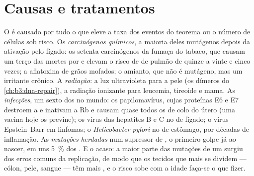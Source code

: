 \section{Causas e tratamentos}

\begin{proposition}[Causas]\label{prop:b3:cancer-biology:causes}
O  é causado por tudo o que eleve a taxa dos eventos do teorema
ou o número de células sob risco. Os \emph{carcinógenos químicos}, a
maioria deles mutágenos depois da ativação pelo fígado: os setenta
carcinógenos da fumaça do tabaco, que causam um terço das mortes por
 e elevam o risco de  de pulmão de quinze a vinte e cinco
vezes; a aflatoxina de grãos mofados; o amianto, que não é mutágeno,
mas um irritante crônico. A \emph{radiação}: a luz ultravioleta para a
pele (os dímeros do \cref{ch:b3:dna-repair}), a radiação ionizante para
leucemia, tireoide e mama. As \emph{infecções}, um sexto dos 
no mundo: os papilomavírus, cujas proteínas E6 e E7 destroem a  e
inativam a Rb e causam quase todos os  de colo do útero (uma
vacina hoje os previne); os vírus das hepatites B e C no  de
fígado; o vírus Epstein--Barr em linfomas; o \emph{Helicobacter pylori}
no  de estômago, por décadas de inflamação. As \emph{mutações
herdadas} num supressor de , o primeiro golpe já ao nascer, em
uns \qty{5}{\%} dos . E o acaso: a maior parte das mutações de
um  surgiu dos erros comuns da replicação, de modo que os tecidos
que mais se dividem --- cólon, pele, sangue --- têm mais , e o
risco sobe com a idade faça-se o que fizer.
\end{proposition}

